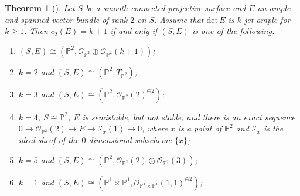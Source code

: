 \documentclass[a4paper]{amsart}
\theoremstyle{plain}
\newtheorem*{theorem*}{Theorem}
\theoremstyle{definition}
\begin{document}
\begin{theorem*}[\cite{Takahashi}]
    \label{Takahashi}
    Let $S$ be a smooth connected projective surface and $E$ an ample
    and spanned vector bundle of rank $2$ on $S$. Assume that $\mathrm{det}\, E$ is $k$-jet ample for
    $k \geq 1$. Then $c_2(E) = k+1$ if and only if $(S, E)$ is one of the following:
        \begin{enumerate}
            \item $(S, E)\cong (\mathbb P^2, \mathcal O_{\mathbb P^2}\oplus \mathcal O_{\mathbb P^2}(k+1))$;
            \item $k=2$ and $(S, E) \cong (\mathbb P^2, T_{\mathbb P^2})$;
            \item $k = 3$ and $(S, E)\cong (\mathbb P^2, \mathcal O_{\mathbb P^2}(2)^{\oplus 2})$;
            \item $k=4$, $S\cong \mathbb P^2$, $E$ is semistable, but not stable, and there is an exact sequence $0 \to \mathcal O_{\mathbb P^2}(2)\to E \to \mathcal I_x(1)\to 0$, where $x$ is a point of $\mathbb P^2$ and $\mathcal I_x$ is the ideal sheaf of the $0$-dimensional subscheme $\{x\}$;
            \item $k = 5$ and $(S, E) \cong (\mathbb P^2, \mathcal O_{\mathbb P^2}(2)\oplus \mathcal O_{\mathbb P^2}(3))$;
            \item $k = 1$ and $(S, E) \cong (\mathbb P^1 \times \mathbb P^1, \mathcal O_{\mathbb P^1 \times \mathbb P^1}(1,1)^{\oplus 2} )$;

\end{enumerate}
\end{theorem*}
\end{document}
